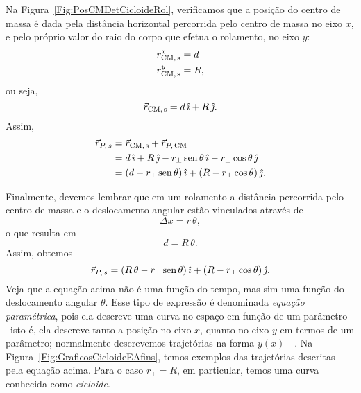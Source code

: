 Na Figura~\ref{Fig:PosCMDetCicloideRol}, verificamos que a posição do centro de massa é dada pela distância horizontal percorrida pelo centro de massa no eixo $x$, e pelo próprio valor do raio do corpo que efetua o rolamento, no eixo $y$:
\begin{align}
    r_{\rm{CM}, \, s}^x &= d \\
    r_{\rm{CM}, \, s}^y &= R,
\end{align}
%
ou seja,
\begin{equation}
    \vec{r}_{\rm{CM}, \, s} = d \, \hat{\imath} + R \, \hat{\jmath}.
\end{equation}
%
Assim,
\begin{align}
    \vec{r}_{P, \, s} & = \vec{r}_{\rm{CM}, \, s} + \vec{r}_{P, \,\rm{CM}} \\
    &= d \, \hat{\imath} + R \, \hat{\jmath} - r_\perp \operatorname{sen}\theta \, \hat{\imath} - r_\perp \cos\theta \, \hat{\jmath} \\
    &= (d - r_\perp \operatorname{sen}\theta)\,\hat{\imath} + (R - r_\perp \cos\theta)\,\hat{\jmath}.
\end{align}

Finalmente, devemos lembrar que em um rolamento a distância percorrida pelo centro de massa e o deslocamento angular estão vinculados através de
\begin{equation}
    \Delta x = r\,\theta,
\end{equation}
%
o que resulta em
\begin{equation}
    d = R\,\theta.
\end{equation}
%
Assim, obtemos
\begin{equation}\label{Eq:TrajetoriaPontosQueRolam}
    \vec{r}_{P, \, s} = (R\,\theta - r_\perp \operatorname{sen}\theta)\,\hat{\imath} + (R - r_\perp \cos\theta)\,\hat{\jmath}.
\end{equation}
%
Veja que a equação acima não é uma função do tempo, mas sim uma função do deslocamento angular $\theta$. Esse tipo de expressão é denominada \emph{equação paramétrica}, pois ela descreve uma curva no espaço em função de um parâmetro --~isto é, ela descreve tanto a posição no eixo $x$, quanto no eixo $y$ em termos de um parâmetro; normalmente descrevemos trajetórias na forma $y(x)$~--. Na Figura~\ref{Fig:GraficosCicloideEAfins}, temos exemplos das trajetórias descritas pela equação acima. Para o caso $r_\perp = R$, em particular, temos uma curva conhecida como \emph{cicloide}. 

